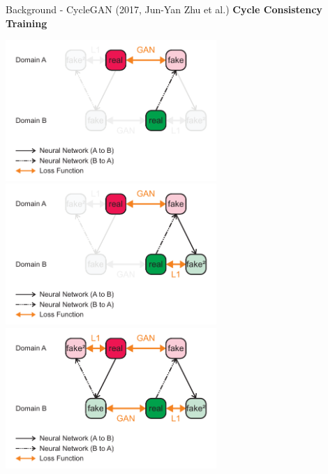 \documentclass[aspectratio=169]{beamer}
\begin{document}
\begin{frame}{Background - CycleGAN (2017, Jun-Yan Zhu et al.)}
\textbf{Cycle Consistency Training}
\vspace{-1em}
\begin{overprint}
\centering\includegraphics[width=0.6\textwidth]{assets/cycleGanLoss_1.pdf}\hspace{5em}~
\centering\includegraphics[width=0.6\textwidth]{assets/cycleGanLoss_2.pdf}\hspace{5em}~
\centering\includegraphics[width=0.6\textwidth]{../thesis/assets/cycleGanLoss.pdf}\hspace{5em}~
\end{overprint}
\end{frame}
\end{document}
